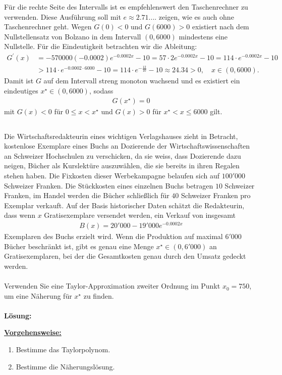 Für die rechte Seite des Intervalls ist es empfehlenswert den Taschenrechner zu verwenden. 
Diese Ausführung soll mit $e \approx 2.71....$ zeigen, wie es auch ohne Taschenrechner geht. 
Wegen $G(0) < 0$ und $G(6000) > 0$ existiert nach dem Nullstellensatz von Bolzano in dem Intervall $(0,6000)$ mindestens eine Nullstelle. Für die Eindeutigkeit betrachten wir die Ableitung:
\begin{align*}
	G^\prime(x)
	&=
	-570000 ( - 0.0002) e^{-0.0002 x} - 10
	=
	57 \cdot 2 e^{-0.0002 x} - 10
	=
	114 \cdot e^{-0.0002 x}- 10\\
	&> 
	114 \cdot e^{-0.0002 \cdot 6000} - 10
	=
	114 \cdot e^{-\frac{12}{10}} - 10 \approx 24.34  > 0, 
	\quad x \in ( 0 , 6000).
\end{align*}
Damit ist $G$ auf dem Intervall streng monoton wachsend und es existiert ein eindeutiges $x^\star \in (0,6000) $, sodass 
\begin{align*}
	G(x^\star) = 0
\end{align*} 
mit $G(x) < 0$ für $0 \leq x < x^\star$ und $G(x) > 0$ für $x^\star < x \leq 6000$ gilt.
\newpage

\subsection*{}
Die Wirtschaftsredakteurin eines wichtigen Verlagshauses zieht in Betracht,
kostenlose Exemplare eines Buchs an Dozierende der Wirtschaftswissenschaften an Schweizer Hochschulen zu verschicken, da sie weiss, dass Dozierende dazu neigen, Bücher als Kurslektüre auszuwählen, die sie bereits in ihren Regalen stehen haben. Die Fixkosten dieser Werbekampagne belaufen sich auf $100'000$ Schweizer Franken.
Die Stückkosten eines einzelnen Buchs betragen $10$ Schweizer Franken, im Handel werden die Bücher schließlich für $40$ Schweizer Franken pro Exemplar verkauft.
Auf der Basis historischer Daten schätzt die Redakteurin, dass wenn $x$ Gratisexemplare versendet werden, ein Verkauf von insgesamt
\begin{align*}
	B(x) = 20'000 - 19'000 e^{-0.0002 x }
\end{align*}
Exemplaren des Buchs erzielt wird. Wenn die Produktion auf maximal $6'000$ Bücher beschränkt ist, gibt es genau eine Menge $ x^\star \in (0, 6'000)$ an Gratisexemplaren, bei der die Gesamtkosten genau durch den Umsatz gedeckt werden.\\
\\
Verwenden Sie eine Taylor-Approximation zweiter Ordnung im Punkt $x_0 = 750$, um eine Näherung für $x^\star$ zu finden.
\\
 \\
\textbf{Lösung:}
\begin{mdframed}
\underline{\textbf{Vorgehensweise:}}
\renewcommand{\labelenumi}{\theenumi.}
\begin{enumerate}
\item Bestimme das Taylorpolynom.
\item Bestimme die Näherungslösung. 
\end{enumerate}
\end{mdframed}

